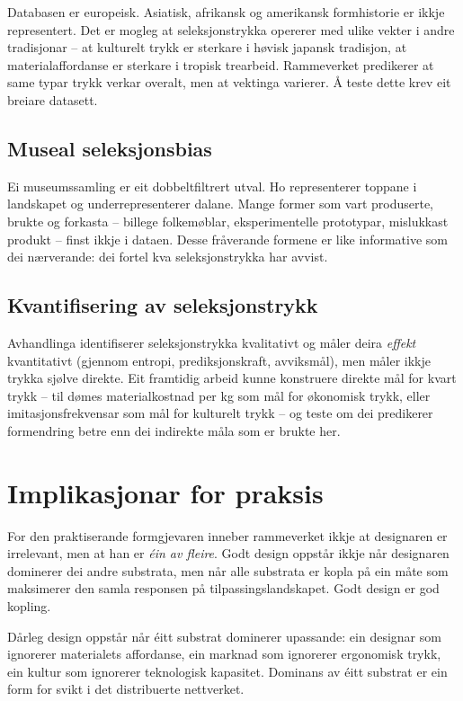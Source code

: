 \documentclass[12pt,a4paper,oneside]{report}
\begin{document}
Databasen er europeisk. Asiatisk, afrikansk og amerikansk formhistorie er ikkje representert. Det er mogleg at seleksjonstrykka opererer med ulike vekter i andre tradisjonar -- at kulturelt trykk er sterkare i høvisk japansk tradisjon, at materialaffordanse er sterkare i tropisk trearbeid. Rammeverket predikerer at same typar trykk verkar overalt, men at vektinga varierer. Å teste dette krev eit breiare datasett.

\subsection{Museal seleksjonsbias}

Ei museumssamling er eit dobbeltfiltrert utval. Ho representerer toppane i landskapet og underrepresenterer dalane. Mange former som vart produserte, brukte og forkasta -- billege folkemøblar, eksperimentelle prototypar, mislukkast produkt -- finst ikkje i dataen. Desse fråverande formene er like informative som dei nærverande: dei fortel kva seleksjonstrykka har avvist.

\subsection{Kvantifisering av seleksjonstrykk}

Avhandlinga identifiserer seleksjonstrykka kvalitativt og måler deira \emph{effekt} kvantitativt (gjennom entropi, prediksjonskraft, avviksmål), men måler ikkje trykka sjølve direkte. Eit framtidig arbeid kunne konstruere direkte mål for kvart trykk -- til dømes materialkostnad per kg som mål for økonomisk trykk, eller imitasjonsfrekvensar som mål for kulturelt trykk -- og teste om dei predikerer formendring betre enn dei indirekte måla som er brukte her.

\section{Implikasjonar for praksis}

For den praktiserande formgjevaren inneber rammeverket ikkje at designaren er irrelevant, men at han er \emph{éin av fleire}. Godt design oppstår ikkje når designaren dominerer dei andre substrata, men når alle substrata er kopla på ein måte som maksimerer den samla responsen på tilpassingslandskapet. Godt design er god kopling.

Dårleg design oppstår når éitt substrat dominerer upassande: ein designar som ignorerer materialets affordanse, ein marknad som ignorerer ergonomisk trykk, ein kultur som ignorerer teknologisk kapasitet. Dominans av éitt substrat er ein form for svikt i det distribuerte nettverket.
\end{document}
